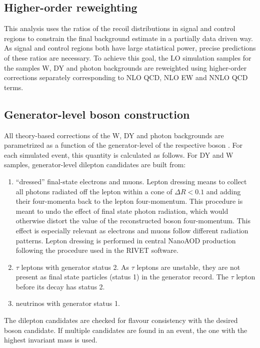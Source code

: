 \subsection{Higher-order reweighting}\label{sec:nlo}
This analysis uses the ratios of the recoil distributions in signal and control regions to constrain the final background estimate in a partially data driven way. As signal and control regions both have large statistical power, precise predictions of these ratios are necessary. To achieve this goal, the LO simulation samples for the samples W, DY and photon backgrounds are reweighted using higher-order corrections separately corresponding to NLO QCD, NLO EW and NNLO QCD terms.

\subsection{Generator-level boson construction}
All theory-based corrections of the W, DY and photon backgrounds are parametrized as a function of the generator-level \pt of the respective boson \ptv. For each simulated event, this quantity is calculated as follows. For DY and W samples, generator-level dilepton candidates are built from:

\begin{enumerate}
\item ``dressed'' final-state electrons and muons. Lepton dressing means to collect all photons radiated off the lepton within a cone of $\Delta R < 0.1$ and adding their four-momenta back to the lepton four-momentum. This procedure is meant to undo the effect of final state photon radiation, which would otherwise distort the value of the reconstructed boson four-momentum. This effect is especially relevant as electrons and muons follow different radiation patterns. Lepton dressing is performed in central NanoAOD production following the procedure used in the RIVET software.
\item $\tau$ leptons with generator status 2. As $\tau$ leptons are unstable, they are not present as final state particles (status 1) in the generator record. The $\tau$ lepton before its decay has status 2.
\item neutrinos with generator status 1.
\end{enumerate}

The dilepton candidates are checked for flavour consistency with the desired boson candidate. If multiple candidates are found in an event, the one with the highest invariant mass is used.

